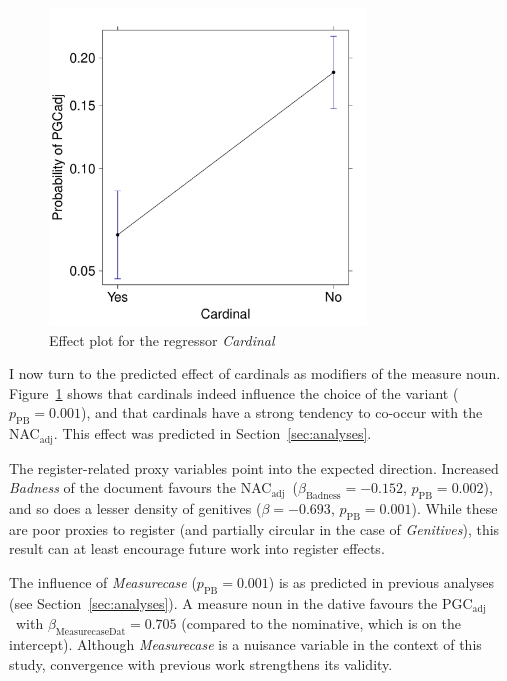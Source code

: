 \documentclass[USenglish]{article}
\newcommand{\Sub}[1]{\ensuremath{\mathrm{_{#1}}}}
\newcommand{\mpPB}{\ensuremath{p_{\text{PB}}}}
\newcommand{\NACa}{NAC\Sub{adj}}
\newcommand{\PGCa}{PGC\Sub{adj}}
\begin{document}

\begin{figure}[h!]
  \centering
  \includegraphics[width=0.75\textwidth]{../R/output/corpus_Cardinal}
  \caption{Effect plot for the regressor \textit{Cardinal}}
  \label{fig:eff:leftcontext}
\end{figure}

I now turn to the predicted effect of cardinals as modifiers of the measure noun.
Figure~\ref{fig:eff:leftcontext} shows that cardinals indeed influence the choice of the variant ($\mpPB=0.001$), and that cardinals have a strong tendency to co-occur with the \NACa.
This effect was predicted in Section~\ref{sec:analyses}.


The register-related proxy variables point into the expected direction.
Increased \textit{Badness} of the document favours the \NACa\ ($\beta_{\text{Badness}}=-0.152$, $\mpPB=0.002$), and so does a lesser density of genitives ($\beta=-0.693$, $\mpPB=0.001$).
While these are poor proxies to register (and partially circular in the case of \textit{Genitives}), this result can at least encourage future work into register effects. 


The influence of \textit{Measurecase} ($\mpPB=0.001$) is as predicted in previous analyses (see Section~\ref{sec:analyses}).
A measure noun in the dative favours the \PGCa\ with $\beta_{\text{MeasurecaseDat}}=0.705$ (compared to the nominative, which is on the intercept).
Although \textit{Measurecase} is a nuisance variable in the context of this study, convergence with previous work strengthens its validity.
\end{document}
